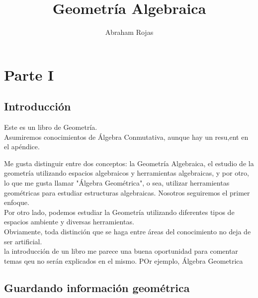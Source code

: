 \documentclass[12pt]{book}
\begin{document}
\title{Geometría Algebraica}	
\author{Abraham Rojas}
\date{ }

\maketitle
\tableofcontents
\part{Parte I}

\chapter{Introducción}

Este es un libro de Geometría. \\

Asumiremos conocimientos de Álgebra Conmutativa, aunque hay un resu,ent en el apéndice.

Me gusta distinguir entre dos conceptos: la Geometría Algebraica, el estudio de la geometría utilizando espacios algebraicos y herramientas algebraicas, y por otro, lo que me gusta llamar "Álgebra Geométrica", o sea, utilizar herramientas geométricas para estudiar estructuras algebraicas. Nosotros seguiremos el primer enfoque.\\

Por otro lado, podemos estudiar la Geometría utilizando diferentes tipos de espacios ambiente y diversas herramientas. \\

Obviamente, toda distinción que se haga entre áreas del conocimiento no deja de ser artificial. \\

la introducción de un libro me parece una buena oportunidad para comentar temas qeu no serán explicados en el mismo. POr ejemplo, Álgebra Geometrica


\chapter{Guardando información geométrica}
\end{document}

